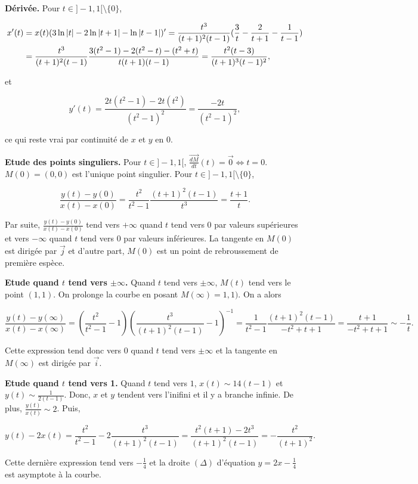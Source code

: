 {\begin{enumerate}
{\textbf{Dérivée.} Pour $t\in]-1,1[\setminus\{0\}$,

\begin{align*}\ensuremath
x'(t)&=x(t)(3\ln|t|-2\ln|t+1|-\ln|t-1|)'=\frac{t^3}{(t+1)^2(t-1)}(\frac{3}{t}-\frac{2}{t+1}-\frac{1}{t-1})\\
 &=\frac{t^3}{(t+1)^2(t-1)}\frac{3(t^2-1)-2(t^2-t)-(t^2+t)}{t(t+1)(t-1)}=\frac{t^2(t-3)}{(t+1)^3(t-1)^2},
\end{align*}

et

$$y'(t)=\frac{2t(t^2-1)-2t(t^2)}{(t^2-1)^2}=\frac{-2t}{(t^2-1)^2},$$

ce qui reste vrai par continuité de $x$ et $y$ en $0$.

\textbf{Etude des points singuliers.} Pour $t\in]-1,1[$, $\overrightarrow{\frac{dM}{dt}}(t)=\vec{0}\Leftrightarrow t=0$. $M(0)=(0,0)$ est l'unique point singulier. Pour $t\in]-1,1[\setminus\{0\}$,

$$\frac{y(t)-y(0)}{x(t)-x(0)}=\frac{t^2}{t^2-1}\frac{(t+1)^2(t-1)}{t^3}=\frac{t+1}{t}.$$

Par suite, $\frac{y(t)-y(0)}{x(t)-x(0)}$ tend vers $+\infty$ quand $t$ tend vers $0$ par valeurs supérieures et vers $-\infty$ quand $t$ tend vers $0$ par valeurs inférieures. La tangente en $M(0)$ est dirigée par $\vec{j}$ et d'autre part, $M(0)$ est un point de rebroussement de première espèce.

\textbf{Etude quand $t$ tend vers $\pm\infty$.} Quand $t$ tend vers $\pm\infty$, $M(t)$ tend vers le point $(1,1)$. On prolonge la courbe en posant $M(\infty)=1,1)$. On a alors

$$\frac{y(t)-y(\infty)}{x(t)-x(\infty)}=(\frac{t^2}{t^2-1}-1)(\frac{t^3}{(t+1)^2(t-1)}-1)^{-1}=\frac{1}{t^2-1}
\frac{(t+1)^2(t-1)}{-t^2+t+1}=\frac{t+1}{-t^2+t+1}\sim-\frac{1}{t}.$$

Cette expression tend donc vers $0$ quand $t$ tend vers $\pm\infty$ et la tangente en $M(\infty)$ est dirigée par $\vec{i}$.

\textbf{Etude quand $t$ tend vers 1.} Quand $t$ tend vers $1$, $x(t)\sim{1}{4(t-1)}$ et $y(t)\sim\frac{1}{2(t-1)}$. Donc, $x$ et $y$ tendent vers l'inifini et il y a branche infinie. De plus, $\frac{y(t)}{x(t)}\sim2$. Puis,

$$y(t)-2x(t)=\frac{t^2}{t^2-1}-2\frac{t^3}{(t+1)^2(t-1)}=\frac{t^2(t+1)-2t^3}{(t+1)^2(t-1)}=-\frac{t^2}{(t+1)^2}.$$

Cette dernière expression tend vers $-\frac{1}{4}$ et la droite $(\Delta)$ d'équation $y=2x-\frac{1}{4}$ est asymptote à la courbe.

}
\end{enumerate}}

